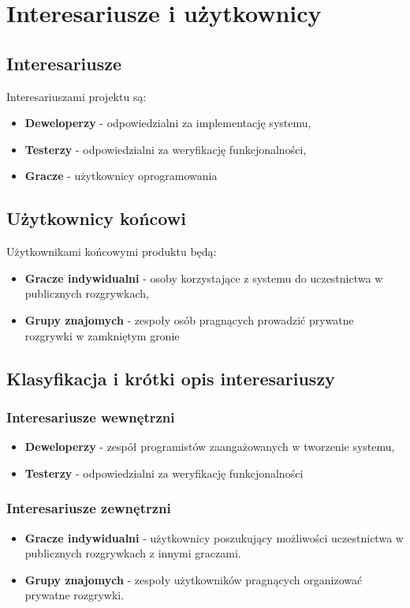 \documentclass[12pt,a4paper]{book}
\begin{document}
\clearpage

\chapter{Interesariusze i użytkownicy}

\section{Interesariusze}
Interesariuszami projektu są:
\begin{itemize}
    \item \textbf{Deweloperzy} - odpowiedzialni za implementację systemu,
    \item \textbf{Testerzy} - odpowiedzialni za weryfikację funkcjonalności,
    \item \textbf{Gracze} - użytkownicy oprogramowania
\end{itemize}

\section{Użytkownicy końcowi}
Użytkownikami końcowymi produktu będą:
\begin{itemize}
    \item \textbf{Gracze indywidualni} - osoby korzystające z systemu do uczestnictwa w publicznych rozgrywkach,
    \item \textbf{Grupy znajomych} - zespoły osób pragnących prowadzić prywatne rozgrywki w zamkniętym gronie
\end{itemize}

\section{Klasyfikacja i krótki opis interesariuszy}
\subsection{Interesariusze wewnętrzni}
\begin{itemize}
    \item \textbf{Deweloperzy} - zespół programistów zaangażowanych w tworzenie systemu,
    \item \textbf{Testerzy} - odpowiedzialni za weryfikację funkcjonalności
\end{itemize}

\subsection{Interesariusze zewnętrzni}
\begin{itemize}
    \item \textbf{Gracze indywidualni} - użytkownicy poszukujący możliwości uczestnictwa w publicznych rozgrywkach z innymi graczami. 
    \item \textbf{Grupy znajomych} - zespoły użytkowników pragnących organizować prywatne rozgrywki.
\end{itemize}
\end{document}
